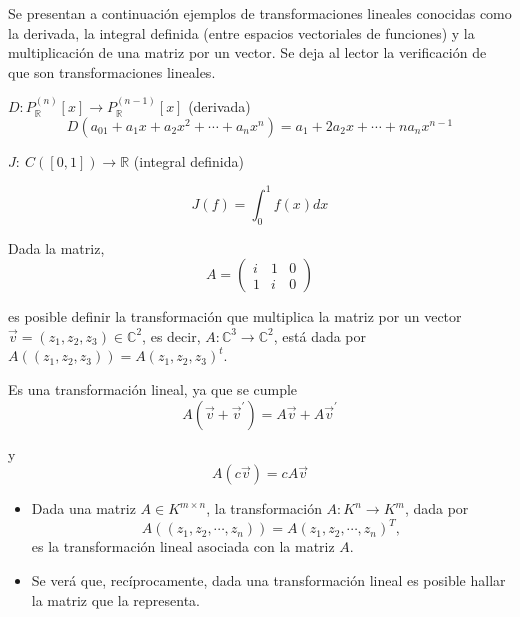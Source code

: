 \bigskip

\bigskip

Se presentan a continuación  ejemplos de  transformaciones lineales  conocidas  como  la derivada, la integral definida (entre espacios vectoriales de funciones) y la multiplicación de una matriz por un vector. Se deja  al lector  la verificación de  que son transformaciones lineales.

\bigskip

\bigskip


\begin{example}
\label{ejderi}
$D: P_{\mathbb{R}}^{(n)}[x] \rightarrow  P_{\mathbb{R}}^{(n-1)} [x] $  (derivada)
$$D(a_01+a_1x+a_2x^{2} + \cdots +a_nx^{n}) = a_1+ 2 a_2x + \cdots +n a_nx^{n-1}     $$
\end{example}

\begin{example}

$J: ~C([0,1])\rightarrow  \mathbb{R}  $     (integral definida)

$$J(f)=\int_0^1 f(x)dx $$

\end{example}

\bigskip
  

\begin{example}

Dada la matriz, 
$$A=\left(\begin{array}{ccc} i & 1 &  0\\
1 &  i  &  0
\end{array}\right)$$

\noindent
es posible definir la transformación que multiplica la  matriz por un vector $ \vec{v}=(z_1,z_2,z_3)  \in \mathbb{C}^2$, es decir,   $A:\mathbb{C}^3 \rightarrow \mathbb{C}^2 $, está  dada por $A ((z_1,z_2,z_3))= A (z_1,z_2,z_3)^t$.

Es una transformación lineal, ya que se cumple
$$ A (\vec{v} + \vec{v}^{\prime})= A \vec{v} + A\vec{v}^{\prime} $$

y  $$ A (c \vec{v})= c  A \vec{v} $$

\end{example}



\begin{remark}
\label{AyT}
\begin{itemize}
    \item 
Dada una matriz $A \in K^{m \times n } $, la transformación  $A:K^n \rightarrow K^m $, dada por 
$$A ((z_1,z_2, \cdots, z_n)) = A (z_1,z_2, \cdots, z_n)^T,$$ es la transformación lineal asociada con la matriz $A$.
\item
Se verá  que, recíprocamente, dada una transformación lineal es posible hallar la matriz que la representa.
\end{itemize}
\end{remark}


